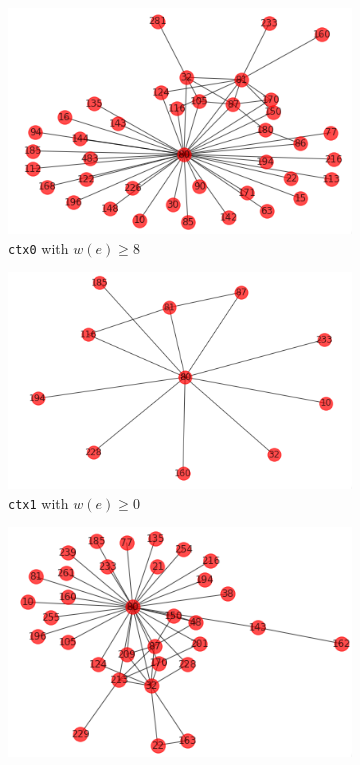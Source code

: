 \documentclass[11pt]{article}
\begin{document}
\begin{figure}[!t]
	\centering
	\begin{subfigure}[b]{0.3\linewidth}
		\centering
		\includegraphics[width=\linewidth]{images/network_ctx0.png}
		\caption[]%
		{{\small \texttt{ctx0} with $w(e) \geq 8$}}    
		\label{fig:network_ctx0}
	\end{subfigure}
	\begin{subfigure}[b]{0.3\linewidth}
		\centering
		\includegraphics[width=\linewidth]{images/network_ctx1.png}
		\caption[]%
		{{\small \texttt{ctx1} with $w(e) \geq 0$}}  
		\label{fig:network_ctx1}
	\end{subfigure}
	\begin{subfigure}[b]{0.3\linewidth}
		\centering
		\includegraphics[width=\linewidth]{images/network_ctx2.png}

\end{subfigure}
\end{figure}
\end{document}
